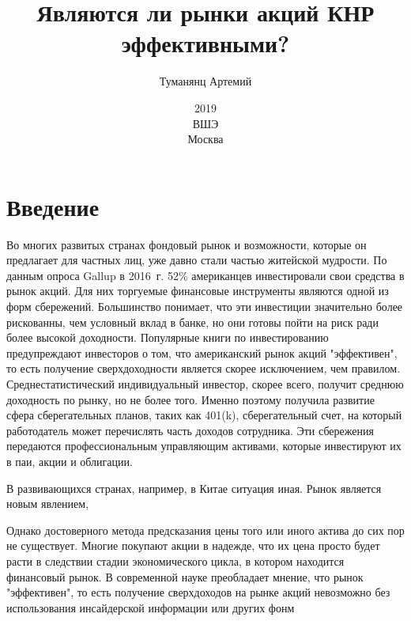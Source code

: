 ﻿\documentclass[a4paper,10pt]{article}
\title{Являются ли рынки акций КНР эффективными?}
\author{Туманянц Артемий}
\date{2019\\ВШЭ\\Москва}
\begin{document}
\maketitle
\newpage
\tableofcontents
\newpage
\section{Введение}
Во многих развитых странах фондовый рынок и возможности, которые он предлагает для частных лиц, уже давно стали частью житейской мудрости. По данным опроса Gallup в 2016~г. 52\%  американцев инвестировали свои средства в рынок акций. Для них торгуемые финансовые инструменты являются одной из форм сбережений. Большинство понимает, что эти инвестиции значительно более рискованны, чем условный вклад в банке, но они готовы пойти на риск ради более высокой доходности. Популярные книги по инвестированию предупреждают инвесторов о том, что американский рынок акций "эффективен", то есть получение сверхдоходности является скорее исключением, чем правилом. Среднестатистический индивидуальный инвестор, скорее всего, получит среднюю доходность по рынку, но не более того. Именно поэтому получила развитие сфера сберегательных планов, таких как 401(k), сберегательный счет, на который работодатель может перечислять часть доходов сотрудника. Эти сбережения передаются профессиональным управляющим активами, которые инвестируют их в паи, акции и облигации.

В развивающихся странах, например, в Китае ситуация иная. Рынок является новым явлением,

 Однако достоверного метода предсказания цены того или иного актива до сих пор не существует. Многие покупают акции в надежде, что их цена просто будет расти в следствии стадии экономического цикла, в котором находится финансовый рынок. В современной науке преобладает мнение, что рынок "эффективен", то есть получение сверхдоходов на рынке акций невозможно без использования инсайдерской информации или других фонм

\newpage


\end{document}
